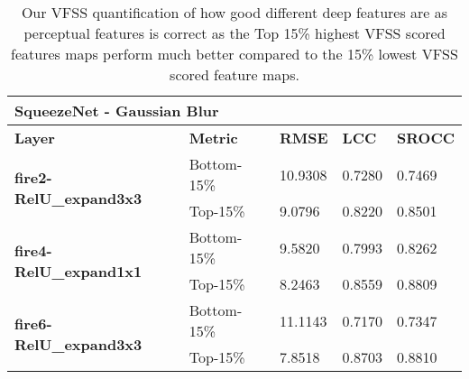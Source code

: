 \documentclass[10pt,twocolumn,letterpaper]{article}
\begin{document}
\begin{table*}[]
\caption{Our VFSS quantification of how good different deep features are as perceptual features is correct as the Top 15\% highest VFSS scored features maps perform much better compared to the 15\% lowest VFSS scored feature maps.}
\centering
\begin{tabular}{|l|l|l|l|l|}
\hline
\multicolumn{5}{|l|}{\textbf{SqueezeNet - Gaussian Blur}}                                                         \\ \hline
\textbf{Layer}                                  & \textbf{Metric} & \textbf{RMSE} & \textbf{LCC} & \textbf{SROCC} \\ \hline
\multirow{2}{*}{\textbf{fire2-RelU\_expand3x3}} & Bottom-15\%            & 10.9308       & 0.7280       & 0.7469         \\ \cline{2-5} 
                                                & Top-15\%             & 9.0796        & 0.8220       & 0.8501         \\ \hline
\multirow{2}{*}{\textbf{fire4-RelU\_expand1x1}} & Bottom-15\%             & 9.5820        & 0.7993       & 0.8262         \\ \cline{2-5} 
                                                & Top-15\%             & 8.2463        & 0.8559       & 0.8809         \\ \hline
\multirow{2}{*}{\textbf{fire6-RelU\_expand3x3}} & Bottom-15\%             & 11.1143       & 0.7170       & 0.7347         \\ \cline{2-5} 
                                                & Top-15\%             & 7.8518        & 0.8703       & 0.8810         \\ \hline
\end{tabular}
\end{table*}
\end{document}
